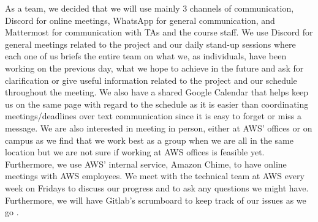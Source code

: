 As a team, we decided that we will use mainly 3 channels of communication, Discord for online meetings, WhatsApp for general communication, and Mattermost for communication with TAs and the course staff. We use Discord for general meetings related to the project and our daily stand-up sessions where each one of us briefs the entire team on what we, as individuals, have been working on the previous day, what we hope to achieve in the future and ask for clarification or give useful information related to the project and our schedule throughout the meeting. We also have a shared Google Calendar that helps keep us on the same page with regard to the schedule as it is easier than coordinating meetings/deadlines over text communication since it is easy to forget or miss a message. We are also interested in meeting in person, either at AWS’ offices or on campus as we find that we work best as a group when we are all in the same location but we are not sure if working at AWS offices is feasible yet. Furthermore, we use AWS’ internal service, Amazon Chime, to have online meetings with AWS employees. We meet with the technical team at AWS every week on Fridays to discuss our progress and to ask any questions we might have. Furthermore, we will have Gitlab's scrumboard to keep track of our issues as we go .

